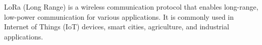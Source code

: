\documentclass{article}
\begin{document}
LoRa (Long Range) is a wireless communication protocol that enables long-range, low-power communication for various applications. It is commonly used in Internet of Things (IoT) devices, smart cities, agriculture, and industrial applications.
\end{document}
